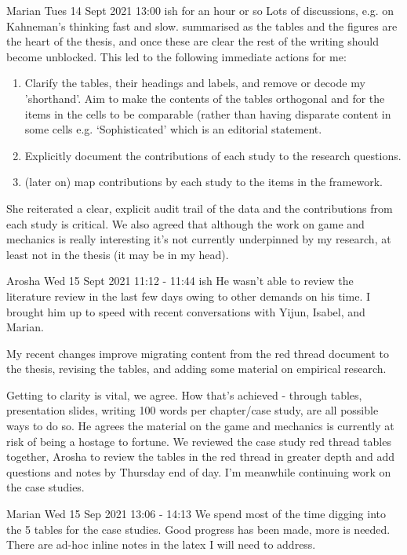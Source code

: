 \dotfill
Marian Tues 14 Sept 2021 13:00 ish for an hour or so
Lots of discussions, e.g. on Kahneman's thinking fast and slow. summarised as the tables and the figures are the heart of the thesis, and once these are clear the rest of the writing should become unblocked. This led to the following immediate actions for me:
\begin{enumerate}
    \item Clarify the tables, their headings and labels, and remove or decode my 'shorthand'. Aim to make the contents of the tables orthogonal and for the items in the cells to be comparable (rather than having disparate content in some cells e.g. `Sophisticated' which is an editorial statement.
    \item Explicitly document the contributions of each study to the research questions.
    \item (later on) map contributions by each study to the items in the framework.
\end{enumerate}

She reiterated a clear, explicit audit trail of the data and the contributions from each study is critical. We also agreed that although the work on game and mechanics is really interesting it's not currently underpinned by my research, at least not in the thesis (it may be in my head).

\dotfill
Arosha Wed 15 Sept 2021 11:12 - 11:44 ish 
He wasn't able to review the literature review in the last few days owing to other demands on his time.
I brought him up to speed with recent conversations with Yijun, Isabel, and Marian. 

My recent changes improve migrating content from the red thread document to the thesis, revising the tables, and adding some material on empirical research.

Getting to clarity is vital, we agree. How that's achieved - through tables, presentation slides, writing 100 words per chapter/case study, are all possible ways to do so. 
He agrees the material on the game and mechanics is currently at risk of being a hostage to fortune. 
We reviewed the case study red thread tables together, 
Arosha to review the tables in the red thread in greater depth and add questions and notes by Thursday end of day.
I'm meanwhile continuing work on the case studies.

\dotfill
Marian Wed 15 Sep 2021 13:06 - 14:13
We spend most of the time digging into the 5 tables for the case studies. Good progress has been made, more is needed. There are ad-hoc inline notes in the latex I will need to address. 

